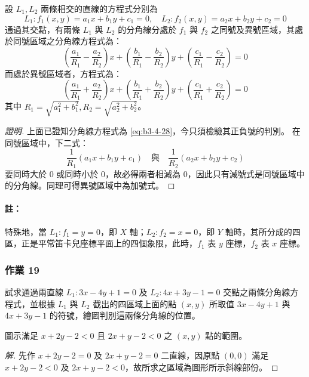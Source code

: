 \begin{proposition}
\label{prop:b3-4-2}
設 $L_1, L_2$ 兩條相交的直線的方程式分別為
\[ L_1 : f_1(x, y) = a_1 x + b_1 y + c_1 = 0, \quad L_2 : f_2(x, y) = a_2 x + b_2 y + c_2 = 0 \]
通過其交點，有兩條 $L_1$ 與 $L_2$ 的分角線分處於 $f_1$ 與 $f_2$ 之同號及異號區域，其處於同號區域之分角線方程式為：
\[ \left(\frac{a_1}{R_1} - \frac{a_2}{R_2}\right)x + \left(\frac{b_1}{R_1} - \frac{b_2}{R_2}\right)y + \left(\frac{c_1}{R_1} - \frac{c_2}{R_2}\right) = 0 \]
而處於異號區域者，方程式為：
\[ \left(\frac{a_1}{R_1} + \frac{a_2}{R_2}\right)x + \left(\frac{b_1}{R_1} + \frac{b_2}{R_2}\right)y + \left(\frac{c_1}{R_1} + \frac{c_2}{R_2}\right) = 0 \]
其中 $R_1 = \sqrt{a_1^2 + b_1^2}, R_2 = \sqrt{a_2^2 + b_2^2}$。
\end{proposition}

\begin{proof}[證明]
上面已證知分角線方程式為 \eqref{eq:b3-4-28}，今只須檢驗其正負號的判別。
在同號區域中，下二式：
\[ \frac{1}{R_1}(a_1 x + b_1 y + c_1) \quad\text{與}\quad \frac{1}{R_2}(a_2 x + b_2 y + c_2) \]
要同時大於 0 或同時小於 0，故必得兩者相減為 0，因此只有減號式是同號區域中的分角線。同理可得異號區域中為加號式。
\end{proof}

\paragraph*{註：}特殊地，當 $L_1 : f_1 = y = 0$，即 $X$ 軸；$L_2 : f_2 = x = 0$，即 $Y$ 軸時，其所分成的四區，正是平常笛卡兒座標平面上的四個象限，此時，$f_1$ 表 $y$ 座標，$f_2$ 表 $x$ 座標。

\subsubsection*{作業 19}
試求通過兩直線 $L_1 : 3x - 4y + 1 = 0$ 及 $L_2 : 4x + 3y - 1 = 0$ 交點之兩條分角線方程式，並根據 $L_1$ 與 $L_2$ 截出的四區域上面的點 $(x, y)$ 所取值 $3x - 4y + 1$ 與 $4x + 3y - 1$ 的符號，繪圖判別這兩條分角線的位置。

\begin{example}[例 17]
圖示滿足 $x + 2y - 2 < 0$ 且 $2x + y - 2 < 0$ 之 $(x, y)$ 點的範圍。
\end{example}

\begin{proof}[解]
先作 $x + 2y - 2 = 0$ 及 $2x + y - 2 = 0$ 二直線，因原點 $(0, 0)$ 滿足 $x + 2y - 2 < 0$ 及 $2x + y - 2 < 0$，故所求之區域為圖形所示斜線部份。
\end{proof}

